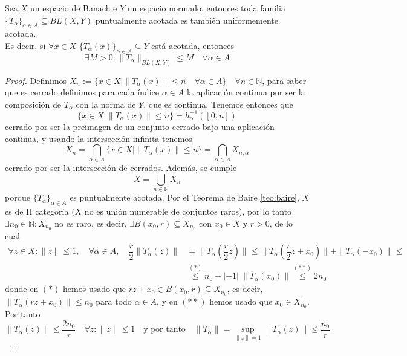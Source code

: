\begin{teo}
    Sea $X$ un espacio de Banach e $Y$ un espacio normado, entonces toda familia $\{T_\alpha\}_{\alpha \in A} \subseteq BL(X, Y)$ puntualmente acotada es también uniformemente acotada. \\
    \noindent
    Es decir, si $\forall x \in X$ $\{T_\alpha(x)\}_{\alpha \in A} \subseteq Y$ está acotada, entonces 
    $$\exists M > 0 : \|T_\alpha\|_{BL(X, Y)} \leq M \quad \forall \alpha \in A$$

\begin{proof}
    Definimos $X_n := \{ x \in X \mid \|T_\alpha(x)\| \leq n \quad \forall \alpha \in A \} \quad \forall n \in \mathbb{N}$, para saber que es cerrado definimos para cada índice $\alpha \in A$ la aplicación
    continua por ser la composición de $T_\alpha$ con la norma de $Y$, que es continua. Tenemos entonces que 
    $$\{ x \in X \mid \|T_\alpha(x)\| \leq n \} = h_\alpha^{-1}([0, n])$$
    cerrado por ser la preimagen de un conjunto cerrado bajo una aplicación continua, y usando la intersección infinita tenemos
    $$X_n = \bigcap_{\alpha \in A} \{ x \in X \mid \|T_\alpha(x)\| \leq n \} = \bigcap_{\alpha \in A} X_{n, \alpha}$$
    cerrado por ser la intersección de cerrados. Además, se cumple 
    $$X = \bigcup_{n \in \mathbb{N}} X_n$$
    porque $\{T_\alpha\}_{\alpha \in A}$ es puntualmente acotada. Por el Teorema de Baire \ref{teo:baire}, $X$ es de II categoría ($X$ no es unión numerable de conjuntos raros), por lo tanto $\exists n_0 \in \mathbb{N} : X_{n_0}$ no es raro, es decir, $\exists B(x_0, r) \subseteq X_{n_0}$ con $x_0\in X$ y $r>0$, de lo cual
    \begin{align*}
        \forall z \in X : \|z\| \leq 1, \quad \forall \alpha \in A, \quad  \dfrac{r}{2} \|T_\alpha(z)\| &= \|T_\alpha\left(\dfrac{r}{2}z\right)\| \leq \|T_\alpha\left(\dfrac{r}{2}z + x_0\right)\| + \|T_\alpha(-x_0)\| \leq \\
        &\overset{(*)}{\leq} n_0 + |-1| \ \|T_\alpha(x_0)\| \overset{(**)}{\leq} 2n_0
    \end{align*}
    donde en $(*)$ hemos usado que $rz + x_0 \in B(x_0, r) \subseteq X_{n_0}$, es decir, $\|T_\alpha(rz + x_0)\| \leq n_0$ para todo $\alpha \in A$, y en $(**)$ hemos usado que $x_0\in X_{n_0}$. Por tanto
    \begin{equation*}
        \|T_\alpha(z)\| \leq \frac{2n_0}{r} \quad \forall z : \|z\| \leq 1 \quad \text{y por tanto} \quad \|T_\alpha\| = \sup_{\|z\|=1} \|T_\alpha(z)\| \leq \frac{n_0}{r} 
    \end{equation*}
\end{proof}
\end{teo}

